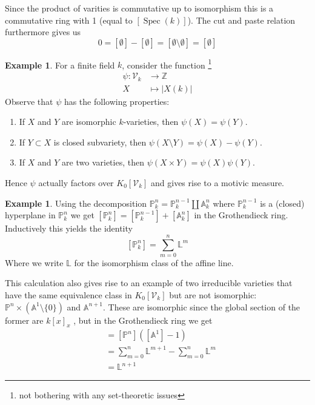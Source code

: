 \documentclass[11pt, a4paper, german]{article}
\theoremstyle{plain}
\theoremstyle{definition}
\newtheorem{example}[theorem]{Example}
\newcommand{\gring}[1][k]{K_0[\mathcal{V}_#1]}
\DeclareMathOperator{\Spec}{Spec}
\begin{document}
Since the product of varities is commutative up to isomorphism this is a commutative ring with 1 (equal to $[\Spec(k)]$). 
The cut and paste relation furthermore gives us
\[
    0 = [\emptyset] - [\emptyset] = [\emptyset \setminus \emptyset] = [\emptyset]
\]

\begin{example}
    For a finite field $k$, consider the function \footnote{not bothering with any set-theoretic issues} 
    \begin{align*}
        \psi \colon \mathcal{V}_k & \to   \mathbb{Z}\\
        X & \mapsto |X(k)|
    \end{align*}
    Observe that $\psi$ has the following properties:
    \begin{enumerate}
        \item If $X$ and $Y$ are isomorphic $k$-varieties, then $\psi(X) = \psi(Y)$.
        \item If $Y \subset X$ is closed subvariety, then $\psi(X \setminus Y) = \psi(X) - \psi(Y)$.
        \item If $X$ and $Y$ are two varieties, then $\psi(X \times Y) = \psi(X)\psi(Y)$.
    \end{enumerate}
    Hence $\psi$ actually factors over $\gring[k]$ and gives rise to a motivic measure.
\end{example}

\begin{example}
    \label{projSum}
    Using the decomposition $\mathbb{P}_k^n = \mathbb{P}_k^{n-1} \coprod \mathbb{A}_k^n$ where $\mathbb{P}_k^{n-1}$ is a (closed) hyperplane
    in $\mathbb{P}_k^n$  we get $[\mathbb{P}_k^n] = [\mathbb{P}_k^{n-1}] + [\mathbb{A}_k^n]$ in the Grothendieck ring.
    Inductively this yields the identity 
    \[
        [\mathbb{P}_k^n] = \sum_{m=0}^n \mathbb{L}^m
    \]
    Where we write $\mathbb{L}$ for the isomorphism class of the affine line.
\end{example}

This calculation also gives rise to an example of two irreducible varieties that have the same equivalence class in $\gring[k]$ but are not
isomorphic: $\mathbb{P}^n \times (\mathbb{A}^1\setminus \{0\})$ and $\mathbb{A}^{n+1}$. These are isomorphic since the global section of the
former are $k[x]_{x}$ , but in the Grothendieck ring we get
\begin{align*}
    [\mathbb{P}^n \times \left (\mathbb{A}^1 \setminus \{0\}\right )] &= [\mathbb{P}^n]\left ([\mathbb{A}^1] - 1\right ) \\
                                                                      &= \sum_{m=0}^n \mathbb{L}^{m+1} - \sum_{m=0}^n \mathbb{L}^m \\
                                                                      &= \mathbb{L}^{n+1}
\end{align*}
\end{document}
